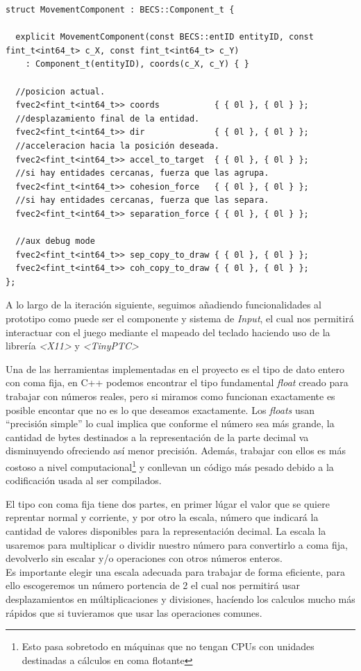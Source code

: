 \begin{lstlisting}[style=CodigoC++, caption={Componente de Movimiento},label=mov_cmp]
struct MovementComponent : BECS::Component_t {

  explicit MovementComponent(const BECS::entID entityID, const fint_t<int64_t> c_X, const fint_t<int64_t> c_Y) 
	: Component_t(entityID), coords(c_X, c_Y) { }

  //posicion actual.
  fvec2<fint_t<int64_t>> coords           { { 0l }, { 0l } };
  //desplazamiento final de la entidad.
  fvec2<fint_t<int64_t>> dir              { { 0l }, { 0l } };
  //acceleracion hacia la posición deseada.
  fvec2<fint_t<int64_t>> accel_to_target  { { 0l }, { 0l } };
  //si hay entidades cercanas, fuerza que las agrupa.
  fvec2<fint_t<int64_t>> cohesion_force   { { 0l }, { 0l } };
  //si hay entidades cercanas, fuerza que las separa.
  fvec2<fint_t<int64_t>> separation_force { { 0l }, { 0l } };

  //aux debug mode
  fvec2<fint_t<int64_t>> sep_copy_to_draw { { 0l }, { 0l } };
  fvec2<fint_t<int64_t>> coh_copy_to_draw { { 0l }, { 0l } };
};
\end{lstlisting}

A lo largo de la iteración siguiente, seguimos añadiendo funcionalidades al prototipo como puede 
ser el componente y sistema de \textit{Input}, el cual nos permitirá interactuar con el juego
mediante el mapeado del teclado haciendo uso de la librería \textit{\textless X11\textgreater}
y \textit{\textless TinyPTC\textgreater}

Una de las herramientas implementadas en el proyecto es el tipo de dato entero con coma fija,
en C++ podemos encontrar el tipo fundamental \textit{float} creado para trabajar con números 
reales, pero si miramos como funcionan exactamente es posible encontar que no es lo que deseamos
exactamente. Los \textit{floats} usan ``precisión simple'' lo cual implica que conforme el número 
sea más grande, la cantidad de bytes destinados a la representación de la parte decimal va 
disminuyendo ofreciendo así menor precisión. Además, trabajar con ellos es más costoso a nivel
computacional\footnote{Esto pasa sobretodo en máquinas que no tengan CPUs con unidades destinadas 
a cálculos en coma flotante} y conllevan un código más pesado debido a la codificación usada 
al ser compilados.

El tipo con coma fija tiene dos partes, en primer lúgar el valor que se quiere reprentar normal
y corriente, y por otro la escala, número que indicará la cantidad de valores disponibles
para la representación decimal. La escala la usaremos para multiplicar o dividir nuestro número
para convertirlo a coma fija, devolverlo sin escalar y/o operaciones con otros números enteros.\\
Es importante elegir una escala adecuada para trabajar de forma eficiente, para ello escogeremos
un número portencia de 2 el cual nos permitirá usar desplazamientos en múltiplicaciones y divisiones,
hacíendo los calculos mucho más rápidos que si tuvieramos que usar las operaciones comunes.


